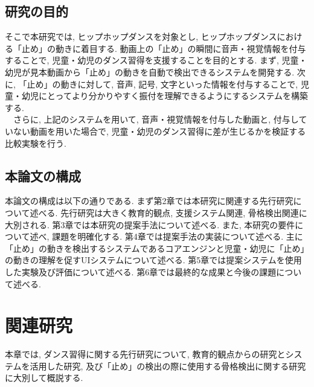 \documentclass[paper]{ieicej}
\begin{document}
\subsection{研究の目的}
そこで本研究では, ヒップホップダンスを対象とし, ヒップホップダンスにおける「止め」の動きに着目する. 動画上の「止め」の瞬間に音声・視覚情報を付与することで, 児童・幼児のダンス習得を支援することを目的とする. まず, 児童・幼児が見本動画から「止め」の動きを自動で検出できるシステムを開発する. 次に, 「止め」の動きに対して, 音声, 記号, 文字といった情報を付与することで, 児童・幼児にとってより分かりやすく振付を理解できるようにするシステムを構築する. \\
　さらに, 上記のシステムを用いて, 音声・視覚情報を付与した動画と, 付与していない動画を用いた場合で, 児童・幼児のダンス習得に差が生じるかを検証する比較実験を行う. 
\subsection{本論文の構成}
本論文の構成は以下の通りである. まず第2章では本研究に関連する先行研究について述べる. 先行研究は大きく教育的観点, 支援システム関連, 骨格検出関連に大別される. 第3章では本研究の提案手法について述べる. また, 本研究の要件について述べ, 課題を明確化する. 第4章では提案手法の実装について述べる. 主に「止め」の動きを検出するシステムであるコアエンジンと児童・幼児に「止め」の動きの理解を促すUIシステムについて述べる. 第5章では提案システムを使用した実験及び評価について述べる. 第6章では最終的な成果と今後の課題について述べる. 
\section{関連研究}
本章では, ダンス習得に関する先行研究について, 教育的観点からの研究とシステムを活用した研究, 及び「止め」の検出の際に使用する骨格検出に関する研究に大別して概説する.
\end{document}
